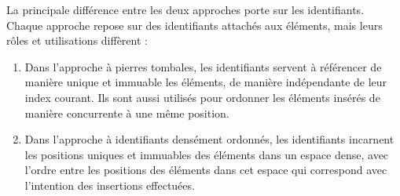 La principale différence entre les deux approches porte sur les identifiants.
Chaque approche repose sur des identifiants attachés aux éléments, mais leurs rôles et utilisations diffèrent :
\begin{enumerate}
  \item Dans l'approche à pierres tombales, les identifiants servent à référencer de manière unique et immuable les éléments, \ie de manière indépendante de leur index courant.
    Ils sont aussi utilisés pour ordonner les éléments insérés de manière concurrente à une même position.
  \item Dans l'approche à identifiants densément ordonnés, les identifiants incarnent les positions uniques et immuables des éléments dans un espace dense, avec l'ordre entre les positions des éléments dans cet espace qui correspond avec l'intention des insertions effectuées.
\end{enumerate}

